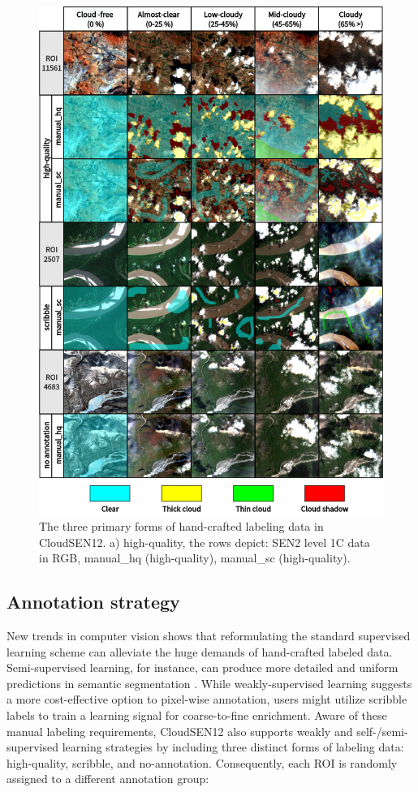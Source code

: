 \documentclass[a4paper, nobind]{templates/cdethesis}
\begin{document}
\begin{figure}[!h]
    \centering
    \includegraphics[width=0.98\linewidth]{figures/chapter01/figure04.png}
    \caption{The three primary forms of hand-crafted labeling data in CloudSEN12. a) high-quality, the rows depict: SEN2 level 1C data in RGB, manual\_hq (high-quality), manual\_sc (high-quality).}
    \label{fig:figure04}
\end{figure}

\hypertarget{annotation-strategy}{%
\subsection{Annotation strategy}\label{annotation-strategy}}

New trends in computer vision shows that reformulating the standard supervised learning scheme can alleviate the huge demands of hand-crafted labeled data. Semi-supervised learning, for instance, can produce more detailed and uniform predictions in semantic segmentation \cite{Castillo-Navarro2020}. While weakly-supervised learning suggests a more cost-effective option to pixel-wise annotation, users might utilize scribble labels to train a learning signal for coarse-to-fine enrichment\cite{Li2020a}. Aware of these manual labeling requirements, CloudSEN12 also supports weakly and self-/semi-supervised learning strategies by including three distinct forms of labeling data: high-quality, scribble, and no-annotation. Consequently, each ROI is randomly assigned to a different annotation group:
\end{document}
